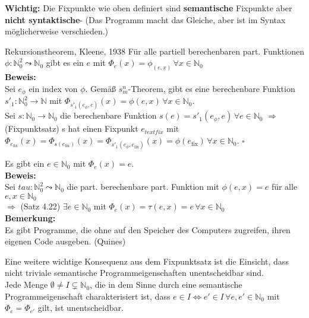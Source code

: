 \textbf{Wichtig:} Die Fixpunkte wie oben definiert sind \textbf{semantische} Fixpunkte aber \textbf{nicht syntaktische}-
(Das Programm macht das Gleiche, aber ist im Syntax möglicherweise verschieden.)

\begin{satz}{Rekursionstheorem, Kleene, 1938}
    Für alle partiell berechenbaren part. Funktionen $\phi: \mathbb{N}_0^2 \leadsto \mathbb{N}_0$ gibt es ein $e$ mit 
    $\Phi_e(x) = \phi_{(e,x)} \, \forall x \in \mathbb{N}_0$ \\

    \textbf{Beweis:} \\
    Sei $e_\phi$ ein index von $\phi$. Gemäß $s^n_m$-Theorem, gibt es eine berechenbare Funktion $s'_1 : \mathbb{N}_0^2 \rightarrow \mathbb{N}$ 
    mit $\Phi_{s'_1(e_\phi,e)}(x) = \phi(e,x) \, \forall x \in \mathbb{N}_0$. \\

    Sei $s: \mathbb{N}_0 \rightarrow \mathbb{N}_0$ die berechenbare Funktion $s(e)= s'_1(e_\phi,e) \, \forall e \in \mathbb{N}_0$
    $\Rightarrow$ (Fixpunktsatz) s hat einen Fixpunkt $e_{text{fix}}$ mit \\
    $\Phi_{e_{\text{fix}}}(x) = \Phi_{s(e_{\text{fix}})}(x) = \Phi_{s'_1(e_\phi,e_{\text{fix}})}(x) = \phi(e_{\text{fix}}) \, \forall x \in \mathbb{N}_0$. $\square$
\end{satz}

\begin{kollar}{}
    Es gibt ein $e \in \mathbb{N}_0$ mit $\Phi_e(x) =e$. \\

    \textbf{Beweis:}\\
    Sei $tau : \mathbb{N}_0^2 \leadsto \mathbb{N}_0$ die part. berechenbare part. Funktion mit $\phi(e,x) = e$ für alle $e,x \in \mathbb{N}_0$ \\
    $\Rightarrow$ (Satz 4.22) $\exists e \in \mathbb{N}_0$ mit $\Phi_e(x) = \tau(e,x)=e \, \forall x \in \mathbb{N}_0$ \\

    \textbf{Bemerkung:} \\
    Es gibt Programme, die ohne auf den Speicher des Computers zugreifen, ihren eigenen Code ausgeben. (Quines)
\end{kollar}

Eine weitere wichtige Konsequenz aus dem Fixpunktsatz ist die Einsicht, dass nicht triviale semantische Programmeigenschaften unentscheidbar sind. \\
Jede Menge $\emptyset \neq I \subsetneq \mathbb{N}_0$, die in dem Sinne durch eine semantische Programmeigenschaft charakterisiert ist, dass
$e \in I \Leftrightarrow e' \in I \, \forall e,e' \in \mathbb{N}_0$ mit $\Phi_e = \Phi_{e'}$ gilt, ist unentscheidbar. \\

